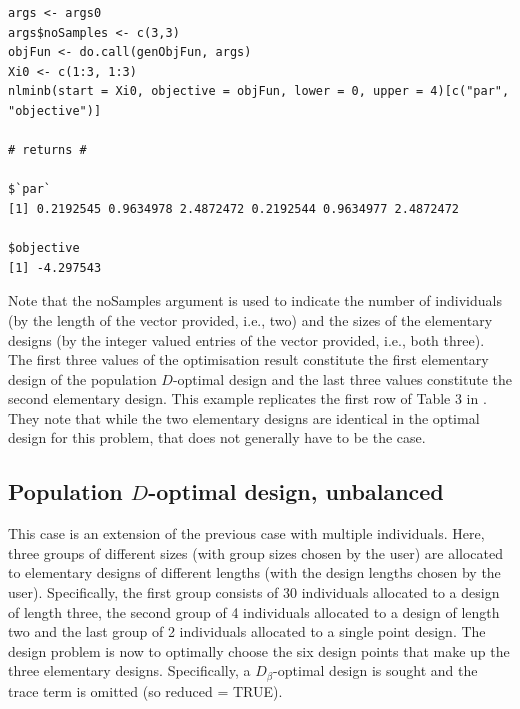 \documentclass{article}
\theoremstyle{example}
\begin{document}
	\begin{verbatim}
args <- args0
args$noSamples <- c(3,3)
objFun <- do.call(genObjFun, args)
Xi0 <- c(1:3, 1:3)
nlminb(start = Xi0, objective = objFun, lower = 0, upper = 4)[c("par", "objective")]

# returns #

$`par`
[1] 0.2192545 0.9634978 2.4872472 0.2192544 0.9634977 2.4872472

$objective
[1] -4.297543
	\end{verbatim}
	
		

	Note that the \textsf{noSamples} argument is used to indicate the number of individuals (by the length of the vector provided, i.e., two) and the sizes of the elementary designs (by the integer valued entries of the vector provided, i.e., both three).
	The first three values of the optimisation result constitute the first elementary design of the population $D$-optimal design and the last three values constitute the second elementary design.
	This example replicates the first row of Table 3 in \cite{Wang2012}.
	They note that while the two elementary designs are identical in the optimal design for this problem, that does not generally have to be the case.

\subsection{Population $D$-optimal design, unbalanced}

	This case is an extension of the previous case with multiple individuals.
	Here, three groups of different sizes (with group sizes chosen by the user) are allocated to elementary designs of different lengths (with the design lengths chosen by the user).
	Specifically, the first group consists of 30 individuals allocated to a design of length three, 
	the second group of 4 individuals allocated to a design of length two and
	the last group of 2 individuals allocated to a single point design.
	The design problem is now to optimally choose the six design points that make up the three elementary designs.
	Specifically, a $D_\beta$-optimal design is sought and the trace term is omitted (so \textsf{reduced = TRUE}).
\end{document}
